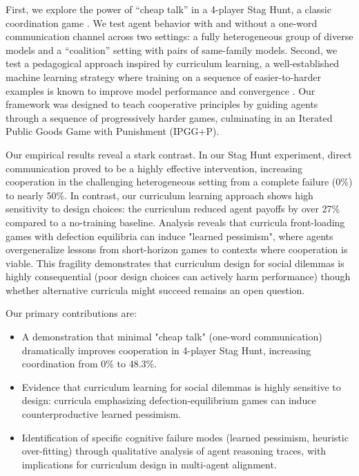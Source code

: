 \documentclass[11pt]{article}
\begin{document}
First, we explore the power of ``cheap talk'' in a 4-player Stag Hunt, a classic coordination game \citep{skyrms2004stag}. We test agent behavior with and without a one-word communication channel across two settings: a fully heterogeneous group of diverse models and a ``coalition'' setting with pairs of same-family models. Second, we test a pedagogical approach inspired by curriculum learning, a well-established machine learning strategy where training on a sequence of easier-to-harder examples is known to improve model performance and convergence \citep{bengio2009curriculum,matiisen2019teacher,willems2020mastering}. Our framework was designed to teach cooperative principles by guiding agents through a sequence of progressively harder games, culminating in an Iterated Public Goods Game with Punishment (IPGG+P).

Our empirical results reveal a stark contrast. In our Stag Hunt experiment, direct communication proved to be a highly effective intervention, increasing cooperation in the challenging heterogeneous setting from a complete failure (0\%) to nearly 50\%. In contrast, our curriculum learning approach shows high sensitivity to design choices: the curriculum reduced agent payoffs by over 27\% compared to a no-training baseline. Analysis reveals that curricula front-loading games with defection equilibria can induce "learned pessimism", where agents overgeneralize lessons from short-horizon games to contexts where cooperation is viable. This fragility demonstrates that curriculum design for social dilemmas is highly 
consequential (poor design choices can actively harm performance) though whether alternative curricula might succeed remains an open question.

Our primary contributions are:
\begin{itemize}
    \item A demonstration that minimal "cheap talk" (one-word communication) dramatically improves cooperation in 4-player Stag Hunt, increasing coordination from 0\% to 48.3\%.
    \item Evidence that curriculum learning for social dilemmas is highly sensitive to design: curricula emphasizing defection-equilibrium games can induce counterproductive learned pessimism.
    \item Identification of specific cognitive failure modes (learned pessimism, heuristic over-fitting) through qualitative analysis of agent reasoning traces, with implications for curriculum design in multi-agent alignment.
\end{itemize}
\end{document}
